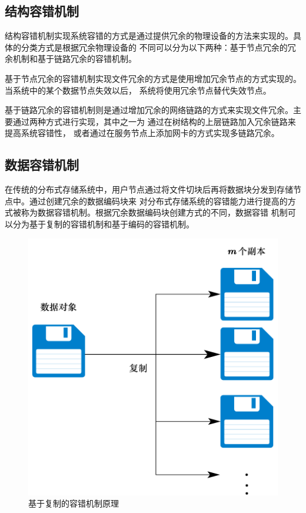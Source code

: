 \subsection{结构容错机制}
结构容错机制实现系统容错的方式是通过提供冗余的物理设备的方法来实现的。具体的分类方式是根据冗余物理设备的
不同可以分为以下两种：基于节点冗余的冗余机制和基于链路冗余的容错机制。

基于节点冗余的容错机制实现文件冗余的方式是使用增加冗余节点的方式实现的。当系统中的某个数据节点失效以后，
系统将使用冗余节点替代失效节点\cite{ghemawat2003google,hua2009smartstore,weil2004dynamic}。

基于链路冗余的容错机制则是通过增加冗余的网络链路的方式来实现文件冗余。主要通过两种方式进行实现，其中之一为
通过在树结构的上层链路加入冗余链路来提高系统容错性\cite{al2008scalable,greenberg2011vl2}，
或者通过在服务节点上添加网卡的方式实现多链路冗余\cite{guo2008dcell,guo2009bcube}。

\subsection{数据容错机制}
在传统的分布式存储系统中，用户节点通过将文件切块后再将数据块分发到存储节点中。通过创建冗余的数据编码块来
对分布式存储系统的容错能力进行提高的方式被称为数据容错机制。根据冗余数据编码块创建方式的不同，数据容错
机制可以分为基于复制的容错机制和基于编码的容错机制。
\begin{figure}[htbp]
	\centering
	\includegraphics [scale=0.5]{figures/1.1.pdf}
	\caption{基于复制的容错机制原理}
	\label{fig:con-1.1}
\end{figure}

